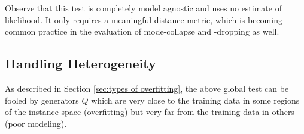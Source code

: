 Observe that this test is completely model agnostic and uses no estimate of likelihood. It only requires a meaningful distance metric, which is becoming common practice in the evaluation of mode-collapse and -dropping \citep{heusel, mehdi} as well.

\subsection{Handling Heterogeneity}
\label{sec:local-versus-global}
As described in Section \ref{sec:types of overfitting}, the above global test can be fooled by generators $Q$ which are very close to the training data in some regions of the instance space (overfitting) but very far from the training data in others (poor modeling). 




